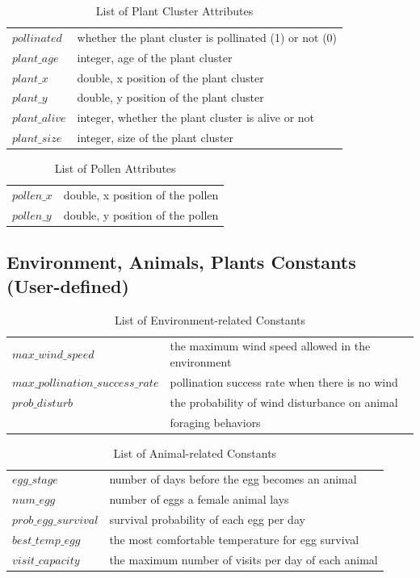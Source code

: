 \documentclass[3p,,preprint,12pt]{elsarticle}
\begin{document}
\begin{table}[!htb]
\begin{tabular}{ l l }
 $pollinated$ & whether the plant cluster is pollinated (1) or not (0)\\
 $plant\_age$ & integer, age of the plant cluster \\ 
 $plant\_x$ & double, x position of the plant cluster \\
 $plant\_y$ & double, y position of the plant cluster \\
 $plant\_alive$ & integer, whether the plant cluster is alive or not\\
 $plant\_size$ & integer, size of the plant cluster\\
\end{tabular}
\caption{\label{tab:table-name}List of Plant Cluster Attributes}
\end{table}

\begin{table}[!htb]
\begin{tabular}{ l l }
 $pollen\_x$ & double, x position of the pollen \\
 $pollen\_y$ & double, y position of the pollen \\
\end{tabular}
\caption{\label{tab:table-name}List of Pollen Attributes}
\end{table}

\pagebreak
\subsection{\textbf{Environment, Animals, Plants Constants (User-defined)}}
\begin{table}[!htb]
\begin{tabular}{ l l }
 $max\_wind\_speed$ & the maximum wind speed allowed in the environment \\
 $max\_pollination\_success\_rate$ & pollination success rate when there is no wind \\
 $prob\_disturb$ & the probability of wind disturbance on animal \\
 & foraging behaviors \\
\end{tabular}
\caption{\label{tab:table-name}List of Environment-related Constants}
\end{table}

\begin{table}[!htb]
\begin{tabular}{ l l }
 $egg\_stage$ & number of days before the egg becomes an animal \\ 
 $num\_egg$ & number of eggs a female animal lays \\ 
 $prob\_egg\_survival$ & survival probability of each egg per day \\
 $best\_temp\_egg$ & the most comfortable temperature for egg survival \\
 $visit\_capacity$ & the maximum number of visits per day of each animal \\
\end{tabular}
\caption{\label{tab:table-name}List of Animal-related Constants}
\end{table}
\end{document}
